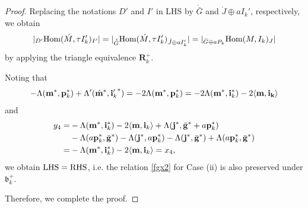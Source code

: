 \documentclass[reqno,12pt]{amsart}
\numberwithin{equation}{section}
\def\lr#1{\langle #1\rangle} \def\fin{\hfill$\square$}  \def\lra{\longrightarrow} \def\mod{\mbox{\rm \textbf{mod}}\,}\def\Mod{\mbox{\rm mod}\,}\def\top{\mbox{\rm top}\,}\def\soc{\mbox{\rm soc}\,}
\theoremstyle{plain} %
\theoremstyle{definition} %
\begin{document}
\begin{proof}
Replacing the notations $D'$ and $I'$ in {\rm LHS} by $\acute{\bar{G}}$ and $\acute{J}\oplus aI_k'$, respectively,
we obtain
\[|_{D'}\mbox{\rm Hom}(\acute{M},\tau I_k')_{ I'}|=|_{\acute{\bar{G}}}\mbox{\rm Hom}(\acute{M},\tau I_k')_{ \acute{J}\oplus aI_k'}|=|_{\bar{G}\oplus aP_k }\mbox{\rm Hom}(M,I_k)_J|\]
by applying the  triangle equivalence $\mathbf{R}_k^+$.

Noting that
\[-\Lambda({\bf m}^\ast,{\bf p}_k^\ast)+\Lambda'(\acute{{\bf m}}^\ast, {{\bf i}_k'}^\ast)=-2\Lambda({\bf m}^\ast,{\bf p}_k^\ast)=-2\Lambda({\bf m}^\ast,{\bf i}_k^\ast)-2\lr{{\bf m},{\bf{i}_k}}\]
and
\begin{align*}
y_4=&-\Lambda({\bf m}^\ast,{\bf i}_k^\ast)-2\lr{{\bf m},{{\bf i}_k}}+\Lambda({\bf j}^\ast, \bar{\bf g}^\ast+a{\bf p}_k^\ast)\\&-\Lambda(a{\bf p}_k^\ast,\bar{\bf g}^\ast)-\Lambda({\bf j}^\ast, a{\bf p}_k^\ast)-\Lambda({\bf j}^\ast, \bar{\bf g}^\ast)+\Lambda(a{\bf p}_k^\ast,\bar{\bf g}^\ast)\\
=&-\Lambda({\bf m}^\ast,{\bf i}_k^\ast)-2\lr{{\bf m},{{\bf i}_k}}=x_4,
\end{align*}
we obtain ${\rm LHS}={\rm RHS}$, i.e. the relation \eqref{fgx2} for Case (ii) is also preserved under $\mathfrak{b}_k^+$.

Therefore, we complete the proof.
\end{proof}
\end{document}
